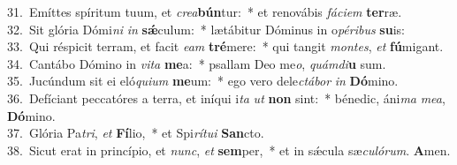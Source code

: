 {31.~}Emíttes spíritum tuum, et \textit{cre}\textit{a}\textbf{bún}tur:~* et renovábis \textit{fá}\textit{ci}\textit{em} \textbf{ter}ræ.\\
{32.~}Sit glória Dómi\textit{ni} \textit{in} \textbf{sǽ}culum:~* lætábitur Dóminus in o\textit{pé}\textit{ri}\textit{bus} \textbf{su}is:\\
{33.~}Qui réspicit terram, et facit \textit{e}\textit{am} \textbf{tré}mere:~* qui tangit \textit{mon}\textit{tes}, \textit{et} \textbf{fú}migant.\\
{34.~}Cantábo Dómino in \textit{vi}\textit{ta} \textbf{me}a:~* psallam Deo me\textit{o}, \textit{quám}\textit{di}\textbf{u} sum.\\
{35.~}Jucúndum sit ei eló\textit{qui}\textit{um} \textbf{me}um:~* ego vero dele\textit{ctá}\textit{bor} \textit{in} \textbf{Dó}mino.\\
{36.~}Defíciant peccatóres a terra, et iníqui i\textit{ta} \textit{ut} \textbf{non} sint:~* bénedic, áni\textit{ma} \textit{me}\textit{a}, \textbf{Dó}mino.\\
{37.~}Glória Pa\textit{tri}, \textit{et} \textbf{Fí}lio,~* et Spi\textit{rí}\textit{tu}\textit{i} \textbf{San}cto.\\
{38.~}Sicut erat in princípio, et \textit{nunc}, \textit{et} \textbf{sem}per,~* et in sǽcula sæ\textit{cu}\textit{ló}\textit{rum}. \textbf{A}men.\\
